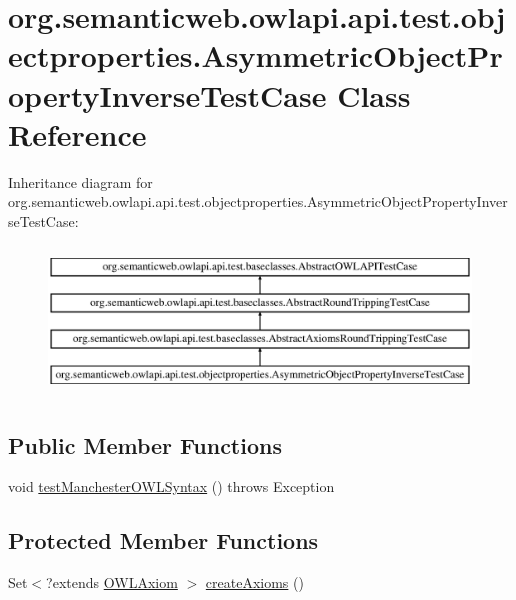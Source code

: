 \hypertarget{classorg_1_1semanticweb_1_1owlapi_1_1api_1_1test_1_1objectproperties_1_1_asymmetric_object_property_inverse_test_case}{\section{org.\-semanticweb.\-owlapi.\-api.\-test.\-objectproperties.\-Asymmetric\-Object\-Property\-Inverse\-Test\-Case Class Reference}
\label{classorg_1_1semanticweb_1_1owlapi_1_1api_1_1test_1_1objectproperties_1_1_asymmetric_object_property_inverse_test_case}
}
Inheritance diagram for org.\-semanticweb.\-owlapi.\-api.\-test.\-objectproperties.\-Asymmetric\-Object\-Property\-Inverse\-Test\-Case\-:\begin{figure}[H]
\begin{center}
\leavevmode
\includegraphics[height=4.000000cm]{classorg_1_1semanticweb_1_1owlapi_1_1api_1_1test_1_1objectproperties_1_1_asymmetric_object_property_inverse_test_case}
\end{center}
\end{figure}
\subsection*{Public Member Functions}
\begin{DoxyCompactItemize}
\item 
void \hyperlink{classorg_1_1semanticweb_1_1owlapi_1_1api_1_1test_1_1objectproperties_1_1_asymmetric_object_property_inverse_test_case_ab6e6435e5c3f6fe96125a46d5c919b23}{test\-Manchester\-O\-W\-L\-Syntax} ()  throws Exception 
\end{DoxyCompactItemize}
\subsection*{Protected Member Functions}
\begin{DoxyCompactItemize}
\item 
Set$<$?extends \hyperlink{interfaceorg_1_1semanticweb_1_1owlapi_1_1model_1_1_o_w_l_axiom}{O\-W\-L\-Axiom} $>$ \hyperlink{classorg_1_1semanticweb_1_1owlapi_1_1api_1_1test_1_1objectproperties_1_1_asymmetric_object_property_inverse_test_case_a0fe335bce09aeaa2162bdf473332f3bc}{create\-Axioms} ()
\end{DoxyCompactItemize}


